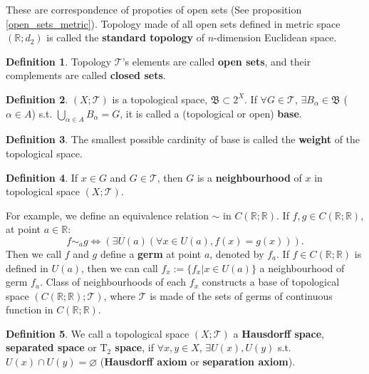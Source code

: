 \documentclass{article}
\theoremstyle{plain}
\theoremstyle{definition}
\newtheorem{dfn}{Definition}[section] %
\begin{document}
These are correspondence of propoties of open sets (See proposition \ref{open_sets_metric}). Topology made of all open sets defined in metric space $(\mathbb{R};d_2)$ is called the \textbf{standard topology} of $n$-dimension Euclidean space.

\begin{dfn}\label{open_set_topology}
Topology $\mathscr{T}$'s elements are called \textbf{open sets}, and their complements are called \textbf{closed sets}.
\end{dfn}
\begin{dfn}\label{topological_base}
$(X;\mathscr{T})$ is a topological space, $\mathfrak{B}\subset 2^X$. If $\forall G \in\mathscr{T}$, $\exists B_\alpha\in\mathfrak{B}$ ($\alpha\in A$) s.t. $\bigcup\limits_{\alpha\in A}B_\alpha = G$, it is called a (topological or open) \textbf{base}.
\end{dfn}
\begin{dfn}\label{weight}
The smallest possible cardinity of base is called the \textbf{weight} of the topological space.
\end{dfn}
\begin{dfn}\label{neighbourhood_topology}
If $x\in G$ and $G\in\mathscr{T}$, then $G$ is a \textbf{neighbourhood} of $x$ in topological space $(X;\mathscr{T})$.
\end{dfn}
For example, we define an equivalence relation $\sim$ in $C(\mathbb{R};\mathbb{R})$. If $f,g\in C(\mathbb{R};\mathbb{R})$, at point $a\in\mathbb{R}$:
\begin{equation}\label{germ}
	f\sim_ag\Leftrightarrow
		\left(
		\exists U(a)\left(\forall x\in U(a),f(x)=g(x)\right)
		\right).
\end{equation}
Then we call $f$ and $g$ define a \textbf{germ} at point $a$, denoted by $f_a$.
If $f\in C(\mathbb{R};\mathbb{R})$ is defined in $U(a)$, then we can call ${f_x}:=\{f_x|x\in U(a)\}$ a neighbourhood of germ $f_a$. Class of neighbourhoods of each $f_x$ constructs a base of topological space $(C(\mathbb{R};\mathbb{R});\mathscr{T})$, where $\mathscr{T}$ is made of the sets of germs of continuous function in $C(\mathbb{R};\mathbb{R})$. 
\begin{dfn}\label{T_2_space}
We call a topological space $(X;\mathscr{T})$ a \textbf{Hausdorff space}, \textbf{separated space} or \textbf{$\mathrm{T}_2$ space}, if $\forall x,y\in X$, $\exists U(x),U(y)$ s.t. $U(x)\cap U(y)=\varnothing$ (\textbf{Hausdorff axiom} or \textbf{separation axiom}).
\end{dfn}
\end{document}
